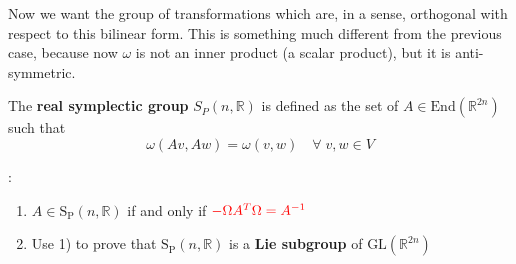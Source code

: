 \documentclass[../main.tex]{subfiles}
\begin{document}
Now we want the group of transformations which are, in a sense, orthogonal with respect to this bilinear form. This is something much different from the previous case, because now $\omega$ is not an inner product (a scalar product), but it is anti-symmetric.
\begin{definition}
The \textbf{real symplectic group} $S_P(n,\mathbb{R})$ is defined as the set of $A\in \textrm{End}(\mathbb{R}^{{2n}})$ such that 
\[
\omega({A}v,{A}w)=\omega(v,w)\quad\forall\; v,w\in V
\]
\end{definition}
\begin{exercise}:
\begin{enumerate}
    \item $A\in \text{S}_\text{P}(n,\mathbb{R})$ if and only if ${\color{red}-\Omega A^T\Omega=A^{-1}}$
    \item Use 1) to prove that $\text{S}_\text{P}(n,\mathbb{R})$ is a \textbf{Lie subgroup} of $\textrm{GL}(\mathbb{R}^{2n})$
\end{enumerate}
\end{exercise}
\end{document}
